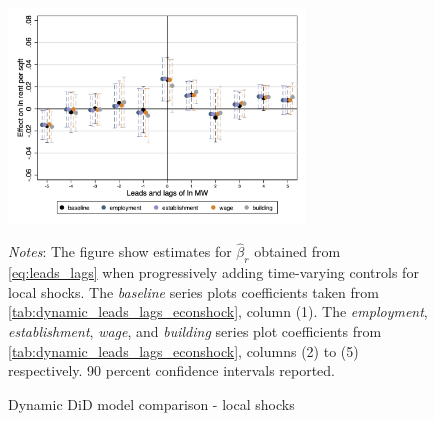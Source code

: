 
\begin{figure}[!h]
    \caption{Dynamic DiD model comparison - local shocks}
    \label{fig:}
    \centering
    \includegraphics[width = 0.7\textwidth]{../analysis/first_differences/output/fd_models_control.png}
    \begin{minipage}{.95\textwidth} \footnotesize
		\vspace{2mm} 
		\textit{Notes}: The figure show estimates for $\hat{\beta}_{r}$ obtained from 
		\autoref{eq:leads_lags} when progressively adding time-varying controls for local shocks. 
		The \textit{baseline} series plots coefficients taken from 
		\autoref{tab:dynamic_leads_lags_econshock}, column (1). The \textit{employment}, 
		\textit{establishment}, \textit{wage}, and \textit{building} series plot coefficients 
		from \autoref{tab:dynamic_leads_lags_econshock}, columns (2) to (5) respectively. 90 
		percent confidence intervals reported.  
	\end{minipage}
\end{figure}